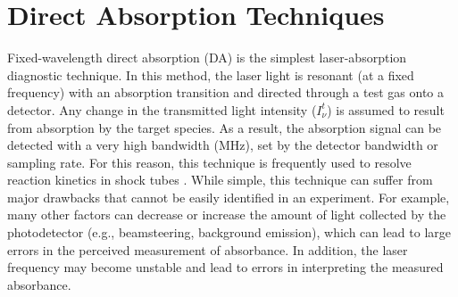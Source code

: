 
\section{Direct Absorption Techniques}
Fixed-wavelength direct absorption (DA) is the simplest laser-absorption diagnostic technique. In this method, the laser light is resonant (at a fixed frequency) with an absorption transition and directed through a test gas onto a detector. Any change in the transmitted light intensity ($I_\nu^t$) is assumed to result from absorption by the target species. As a result, the absorption signal can be detected with a very high bandwidth (MHz), set by the detector bandwidth or sampling rate. For this reason, this technique is frequently used to resolve reaction kinetics in shock tubes \cite{HANSON2014103}. While simple, this technique can suffer from major drawbacks that cannot be easily identified in an experiment. For example, many other factors can decrease or increase the amount of light collected by the photodetector (e.g., beamsteering, background emission), which can lead to large errors in the perceived measurement of absorbance. In addition, the laser frequency may become unstable and lead to errors in interpreting the measured absorbance. 

